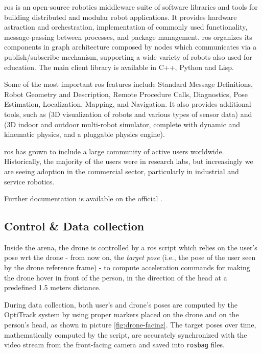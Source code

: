 \gls{ros} is an open-source robotics middleware suite of software libraries and tools for building distributed and modular robot applications. It provides hardware astraction and orchestration, implementation of commonly used functionality, message-passing between processes, and package management. \gls{ros} organizes its components in graph architecture composed by nodes which communicates via a publish/subscribe mechanism, supporting a wide variety of robots also used for education. The main client library is available in C++, Python and Lisp.

Some of the most important \gls{ros} features include Standard Message Definitions, Robot Geometry and Description, Remote Procedure Calls, Diagnostics, Pose Estimation, Localization, Mapping, and Navigation. It also provides additional tools, such as \cite{rviz} (3D visualization of robots and various types of sensor data) and \cite{Gazebo} (3D indoor and outdoor multi-robot simulator, complete with dynamic and kinematic physics, and a pluggable physics engine).

\medskip

\gls{ros} has grown to include a large community of active users worldwide. Historically, the majority of the users were in research labs, but increasingly we are seeing adoption in the commercial sector, particularly in industrial and service robotics.

Further documentation is available on the official \cite{ROS}.



\subsection{Control \& Data collection}
\label{subsec:control}

Inside the arena, the drone is controlled by a \gls{ros} script which relies on the user's pose \gls{wrt} the drone - from now on, the \textit{target pose} (i.e., the pose of the user seen by the drone reference frame) - to compute acceleration commands for making the drone hover in front of the person, in the direction of the head at a predefined 1.5 meters distance. 

\medskip

During data collection, both user's and drone's poses are computed by the OptiTrack system by using proper markers placed on the drone and on the person's head, as shown in picture \ref{fig:drone-facing}. The target poses over time, mathematically computed by the script, are accurately synchronized with the video stream from the front-facing camera and saved into \texttt{rosbag} files.

